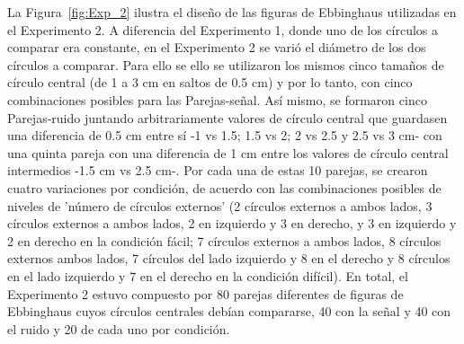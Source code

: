 \begin{itemize}
La Figura~\ref{fig:Exp_2} ilustra el diseño de las figuras de Ebbinghaus utilizadas en el Experimento 2. A diferencia del Experimento 1, donde uno de los círculos a comparar era constante, en el Experimento 2 se varió el diámetro de los dos círculos a comparar. Para ello se ello se utilizaron los mismos cinco tamaños de círculo central (de 1 a 3 cm en saltos de 0.5 cm) y por lo tanto, con cinco combinaciones posibles para las Parejas-señal. Así mismo, se formaron cinco Parejas-ruido juntando arbitrariamente valores de círculo central que guardasen una diferencia de 0.5 cm entre sí -1 vs 1.5; 1.5 vs 2; 2 vs 2.5 y 2.5 vs 3 cm- con una quinta pareja con una diferencia de 1 cm entre los valores de círculo central intermedios -1.5 cm vs 2.5 cm-. Por cada una de estas 10 parejas, se crearon cuatro variaciones por condición, de acuerdo con las combinaciones posibles de niveles de 'número de círculos externos' (2 círculos externos a ambos lados, 3 círculos externos a ambos lados, 2 en izquierdo y 3 en derecho, y 3 en izquierdo y 2 en derecho en la condición fácil; 7 círculos externos a ambos lados, 8 círculos externos ambos lados, 7 círculos del lado izquierdo y 8 en el derecho y 8 círculos en el lado izquierdo y 7 en el derecho en la condición difícil). En total, el Experimento 2 estuvo compuesto por 80 parejas diferentes de figuras de Ebbinghaus cuyos círculos centrales debían compararse, 40 con la señal y 40 con el ruido y 20 de cada uno por condición.\\


\end{itemize}

